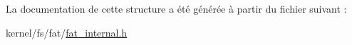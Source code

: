 La documentation de cette structure a été générée à partir du fichier suivant \+:\begin{DoxyCompactItemize}
\item 
kernel/fs/fat/\hyperlink{fat__internal_8h}{fat\+\_\+internal.\+h}\end{DoxyCompactItemize}
